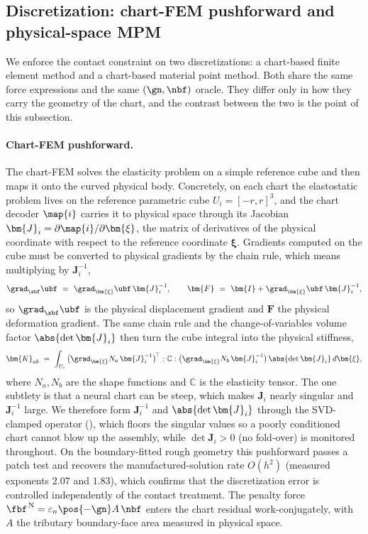 \subsection{Discretization: chart-FEM pushforward and physical-space MPM}\label{sec:form-mpm}

We enforce the contact constraint on two discretizations: a chart-based finite element method and a
chart-based material point method. Both share the same force expressions and the same $(\gn,\nbf)$
oracle. They differ only in how they carry the geometry of the chart, and the contrast between the two
is the point of this subsection.

\paragraph{Chart-FEM pushforward.}
The chart-FEM solves the elasticity problem on a simple reference cube and then maps it onto the curved
physical body. Concretely, on each chart the elastostatic problem lives on the reference parametric
cube $U_i=[-r,r]^3$, and the chart decoder $\map{i}$ carries it to physical space through its Jacobian
$\bm{J}_i=\partial\map{i}/\partial\bm{\xi}$, the matrix of derivatives of the physical coordinate with
respect to the reference coordinate $\bm{\xi}$. Gradients computed on the cube must be converted to
physical gradients by the chain rule, which means multiplying by $\bm{J}_i^{-1}$,
\begin{equation}\label{eq:fem-pushforward}
\grad_{\xbf}\ubf\ =\ \grad_{\bm{\xi}}\ubf\,\bm{J}_i^{-1},
\qquad
\bm{F}\ =\ \bm{I}+\grad_{\bm{\xi}}\ubf\,\bm{J}_i^{-1},
\end{equation}
so $\grad_{\xbf}\ubf$ is the physical displacement gradient and $\bm{F}$ the physical deformation
gradient. The same chain rule and the change-of-variables volume factor $\abs{\det\bm{J}_i}$ then turn
the cube integral into the physical stiffness,
\begin{equation}\label{eq:fem-assembly}
\bm{K}_{ab}\ =\ \int_{U_i}\big(\grad_{\bm{\xi}}N_a\,\bm{J}_i^{-1}\big)^{\!\top}
:\mathbb{C}:\big(\grad_{\bm{\xi}}N_b\,\bm{J}_i^{-1}\big)\,\abs{\det\bm{J}_i}\,d\bm{\xi},
\end{equation}
where $N_a,N_b$ are the shape functions and $\mathbb{C}$ is the elasticity tensor. The one subtlety is
that a neural chart can be steep, which makes $\bm{J}_i$ nearly singular and $\bm{J}_i^{-1}$ large. We
therefore form $\bm{J}_i^{-1}$ and $\abs{\det\bm{J}_i}$ through the SVD-clamped operator
 (), which floors the singular
values so a poorly conditioned chart cannot blow up the assembly, while $\det\bm{J}_i>0$ (no fold-over)
is monitored throughout. On the boundary-fitted rough geometry this pushforward passes a patch test and
recovers the manufactured-solution rate $O(h^2)$ (measured exponents $2.07$ and $1.83$), which
confirms that the discretization error is controlled independently of the contact treatment. The
penalty force $\fbf^{\,\mathrm{N}}=\varepsilon_n\pos{-\gn}A\,\nbf$ enters the chart residual
work-conjugately, with $A$ the tributary boundary-face area measured in physical space.

